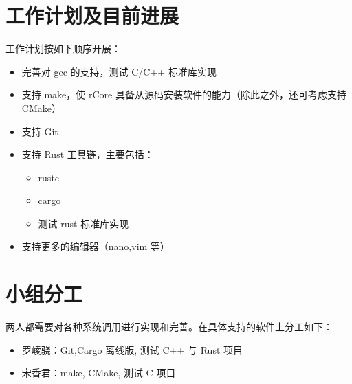 \documentclass{article}
\begin{document}
    \section{工作计划及目前进展}

    工作计划按如下顺序开展：

    \begin{itemize}
        \item 完善对 gcc 的支持，测试 C/C++ 标准库实现
        \item 支持 make，使 rCore 具备从源码安装软件的能力（除此之外，还可考虑支持 CMake）
        \item 支持 Git
        \item 支持 Rust 工具链，主要包括：
        \begin{itemize}
            \item rustc
            \item cargo
            \item 测试 rust 标准库实现
        \end{itemize}
        \item 支持更多的编辑器（nano,vim 等）
    \end{itemize}

    \section{小组分工}
    两人都需要对各种系统调用进行实现和完善。在具体支持的软件上分工如下：
    \begin{itemize}
        \item 罗崚骁：Git,Cargo 离线版, 测试 C++ 与 Rust 项目
        \item 宋香君：make, CMake, 测试 C 项目
    \end{itemize}
\end{document}
